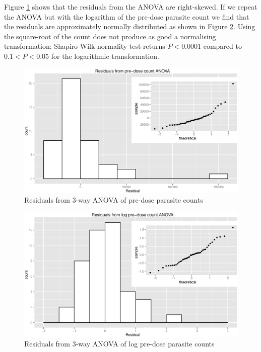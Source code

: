 Figure \ref{aovres} shows that the residuals from the ANOVA are right-skewed. If we repeat the ANOVA but with the logarithm of the pre-dose parasite count we find that the residuals are approximately normally distributed as shown in Figure \ref{logaovres}. Using the square-root of the count does not produce as good a normalising transformation: Shapiro-Wilk normality test returns $P<0.0001$ compared to $0.1<P<0.05$ for the logarithmic transformation. 
\begin{figure}[p]
\begin{center}
\includegraphics[width=150mm]{aovres.eps}
\end{center}
\caption{Residuals from 3-way ANOVA of pre-dose parasite counts}
\label{aovres}
\end{figure} 
\begin{figure}[p]
\begin{center}
\includegraphics[width=150mm]{logaovres.eps}
\end{center}
\caption{Residuals from 3-way ANOVA of log pre-dose parasite counts}
\label{logaovres}
\end{figure} 
